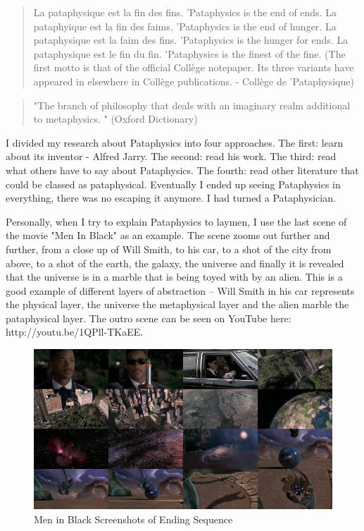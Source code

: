 \begin{quote}
  La pataphysique est la fin des fins.    		  'Pataphysics is the end of ends.
  La pataphyique est la fin des faims.                         'Pataphysics is the end of hunger.
  La pataphysique est la faim des fins.                    'Pataphysics is the hunger for ends.
  La pataphysique est le fin du fin.                          'Pataphysics is the finest of the fine.
  (The first motto is that of the official Collège notepaper. Its three variants have appeared in elsewhere in Collège publications. - Collège de 'Pataphysique) \citep{Brotchie2003}
\end{quote}

\begin{quote}
  "The branch of philosophy that deals with an imaginary realm additional to metaphysics. " (Oxford Dictionary)
\end{quote}

I divided my research about Pataphysics into four approaches. The first: learn about its inventor - Alfred Jarry. The second: read his work. The third: read what others have to say about Pataphysics. The fourth: read other literature that could be classed as pataphysical. Eventually I ended up seeing Pataphysics in everything, there was no escaping it anymore. I had turned a Pataphysician.

Personally, when I try to explain Pataphysics to laymen, I use the last scene of the movie "Men In Black" as an example. The scene zooms out further and further, from a close up of Will Smith, to his car, to a shot of the city from above, to a shot of the earth, the galaxy, the universe and finally it is revealed that the universe is in a marble that is being toyed with by an alien. This is a good example of different layers of abstraction – Will Smith in his car represents the physical layer, the universe the metaphysical layer and the alien marble the pataphysical layer. The outro scene can be seen on YouTube here: http://youtu.be/1QPll-TKaEE.

\begin{figure}[!htb] %
  \centering
  \includegraphics[width=\textwidth]{images/mibwide.png}
  \caption[Men in Black]{Men in Black Screenshots of Ending Sequence}
  \label{fig:MIB}
\end{figure}


